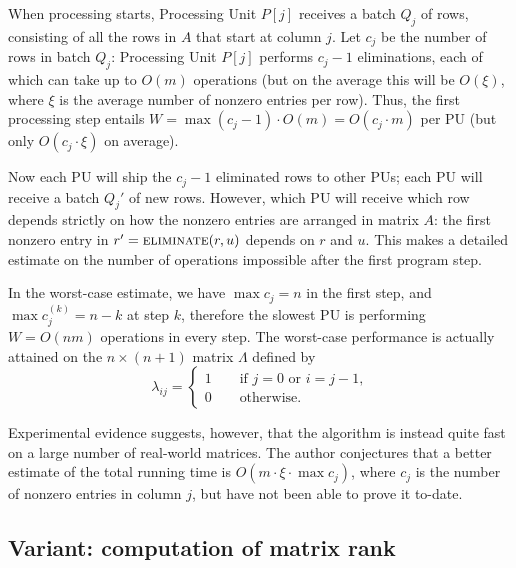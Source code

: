 When processing starts, Processing Unit $P[j]$ receives a batch
$Q_j$ of rows, consisting of all the rows in $A$ that start at
column $j$.  Let $c_j$ be the number of rows in batch $Q_j$:
Processing Unit $P[j]$ performs $c_j - 1$ eliminations, each of
which can take up to $O(m)$ operations (but on the average this will
be $O(\xi)$, where $\xi$ is the average number of nonzero entries per
row).  Thus, the first processing step entails $W = \max(c_j-1) \cdot
O(m) = O(c_j\cdot m)$ per PU (but only $O(c_j \cdot \xi)$ on
average). 

Now each PU will ship the $c_j - 1$ eliminated rows to other
PUs; each PU will receive a batch $Q_j'$ of new rows.  However,
which PU will receive which row depends strictly on how the nonzero
entries are arranged in matrix $A$: the first nonzero entry in $r' =
\textnormal{\scshape eliminate}(r,u)$ depends on $r$ and $u$.  This makes a detailed
estimate on the number of operations impossible after the first
program step. 

In the worst-case estimate, we have $\max c_j = n$ in the first step,
and $\max c_j^{(k)} = n - k$ at step $k$, therefore the slowest PU is
performing $W = O(nm)$ operations in every step.  The worst-case
performance is actually attained on the $n \times (n+1)$ matrix
$\Lambda$ defined by
\begin{equation*}
  \lambda_{ij} =
  \begin{cases}
    1  \qquad \text{if $j=0$ or $i = j-1$,}
    \\
    0  \qquad \text{otherwise.}
  \end{cases}
\end{equation*}

Experimental evidence suggests, however, that the algorithm is instead
quite fast on a large number of real-world matrices.  The author
conjectures that a better estimate of the total running time is $O(m
\cdot \xi \cdot \max c_j)$, where $c_j$ is the number of nonzero
entries in column $j$, but have not been able to prove it
to-date.


\subsection{Variant: computation of matrix rank}
\label{sec:rank}


